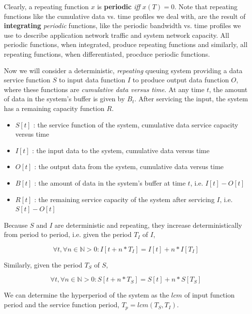 Clearly, a repeating function $x$ is \textbf{periodic} \emph{iff}
$x(T)=0$.  Note that repeating functions like the cumulative
data vs. time profiles we deal with, are the result of \textbf{integrating}
\emph{periodic} functions, like the periodic bandwidth vs. time profiles we
use to describe application network traffic and system network
capacity.  All periodic functions, when integrated, produce repeating
functions and similarly, all repeating functions, when differentiated,
procduce periodic functions.

Now we will consider a deterministic, \emph{repeating} queuing system
providing a data service function $S$ to input data function
$I$ to produce output data function $O$, where these
functions are \emph{cumulative data versus time}.  At any time $t$,
the amount of data in the system's buffer is given by $B_t$.
After servicing the input, the system has a remaining capacity
function $R$.

\begin{itemize}
\item $S[t]$ : the service function of the system, cumulative data
  service capacity versus time
\item $I[t]$ : the input data to the system, cumulative data versus
  time
\item $O[t]$ : the output data from the system, cumulative data
  versus time
\item $B[t]$ : the amount of data in the system's buffer at time
  $t$, i.e. $I[t]-O[t]$
\item $R[t]$ : the remaining service capacity of the system after
  servicing $I$, i.e. $S[t] - O[t]$
\end{itemize}

Because $S$ and $I$ are deterministic and repeating, they
increase deterministically from period to period, i.e. given the
period $T_I$ of $I$,

\begin{equation}
  \forall t, \forall n \in \mathbb{N} > 0 : I[t + n*T_I] =
  I[t] + n*I[T_I]
\end{equation}

Similarly, given the period $T_S$ of $S$,

\begin{equation}
  \forall t, \forall n \in \mathbb{N} > 0 : S[t + n*T_S] =
  S[t] + n*S[T_S]
\end{equation}

We can determine the hyperperiod of the system as the $lcm$ of
input function period and the service function period, $T_p =
lcm(T_S,T_I)$.

